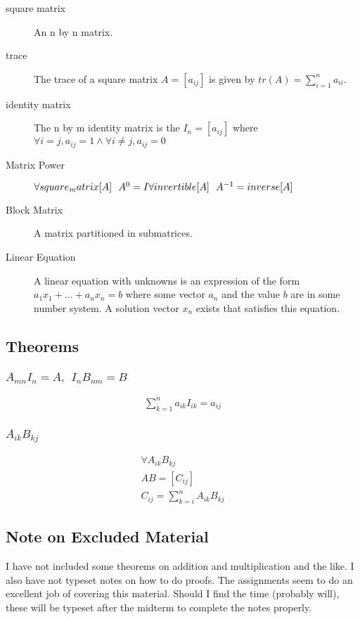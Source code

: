 			\begin{description}
				\item[square matrix] An n by n matrix.
				\item[trace] The trace of a square matrix $A = [a_{ij}]$ is given by $tr(A) = \sum_{i=1}^{n} a_{ii}$.
				\item[identity matrix] The n by m identity matrix is the $I_n = [a_{ij}]$ where $\forall i = j, a_{ij} = 1 \wedge \forall i \neq j, a_{ij} = 0$
				\item[Matrix Power] 
					$\forall square_matrix[A]\ \ A^0 = I \\
					\forall invertible[A]\ \ A^{-1} = inverse[A]$
				\item[Block Matrix] A matrix partitioned in submatrices.
				\item[Linear Equation]  A linear equation with unknowns is an expression of the form $a_1x_1 + \ldots + a_nx_n = b$ where some vector $a_n$ and the value $b$ are in some number system.
				A solution vector $x_n$ exists that satisfies this equation.
			\end{description}
			
	\subsection{Theorems}
		
		\subsubsection{$A_{mn}I_n = A,\ \ I_nB_{nm} = B$}
		
			\begin{align}
				\sum_{k=1}^{n} a_{ik}I_{ik} = a_{ij}
			\end{align}
			
		\subsubsection{$A_{ik}B_{kj}$}
			
			\begin{align}
				\forall A_{ik}B_{kj} \\
				AB = [C_{ij}] \\
				C_{ij} = \sum_{k = i}^{n} A_{ik}B_{kj}
			\end{align}
		
			
	\subsection{Note on Excluded Material}
	
		I have not included some theorems on addition and multiplication and the like.
		I also have not typeset notes on how to do proofs.
		The assignments seem to do an excellent job of covering this material.
		Should I find the time (probably will), these will be typeset after the midterm to complete the notes properly.